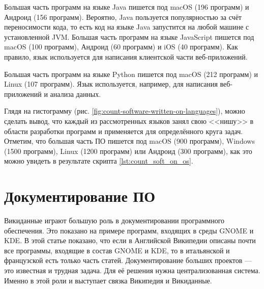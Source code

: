 Большая часть программ на языке Java пишется под macOS (196 программ) и Андроид (156 программ). Вероятно, Java пользуется популярностью за счёт переносимости кода\footnotemark, 
то есть код на языке Java запустится на любой машине с установленной JVM\footnotemark.
\marginnote[0.3cm]{}
Большая часть программ на языке JavaScript пишется под macOS (100 программ), Андроид (60 программ) и iOS (40 программ). Как правило, язык используется для написания клиентской части веб-приложений.

Большая часть программ на языке Python пишется под macOS (212 программ) и Linux (107 программ). Язык используется, например, для написания веб-приложений и анализа данных.

Глядя на гистограмму (рис. \ref{fig:count-software-written-on-languages}), можно сделать вывод, что каждый из рассмотренных языков занял свою <<нишу>> в области разработки программ и применяется для определённого круга задач. Отметим, что большая часть ПО пишется под macOS (900 программ), Windows (1500 программ), Linux (1200 программ) или Андроид (300 программ), как это можно увидеть в результате скрипта \ref{lst:count_soft_on_os}.

\section{Документирование ПО}
Викиданные играют большую роль в документировании программного обеспечения. Это показано на примере программ, входящих в среды GNOME и KDE\cite{Samuel2020DocumentingWiki}. В этой статье показано, что если в Английской Википедии описаны почти все программы, входящие в состав GNOME и KDE, то в итальянской и французской есть только часть статей. Документирование больших проектов --- это известная и трудная задача. Для её решения нужна централизованная система. Именно в этой роли и выступает связка Википедия и Викиданные\cite{Samuel2020DocumentingWiki}.

